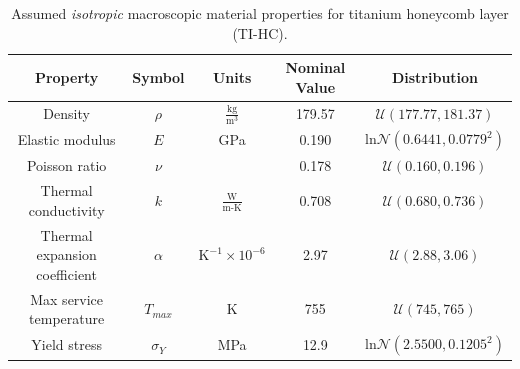\documentclass{article}
\begin{document}
\begin{table}
\caption[TI-HC material properties]{Assumed \textit{isotropic} macroscopic material properties for titanium honeycomb layer (TI-HC).}
\label{tab:matPropTI-HC}
\begin{center}
\begin{tabular}[]{ c | c | c | c | c }
\textbf{Property} & \textbf{Symbol} & \textbf{Units} & \textbf{Nominal Value} & \textbf{Distribution} \\ \hline
Density & $\rho$ & $\frac{\textrm{kg}}{\textrm{m}^3}$ & 179.57 & $\mathcal{U}(177.77,181.37)$ \\ \hline
Elastic modulus& $E$ & GPa & 0.190 & $\textrm{ln}\mathcal{N}(0.6441,0.0779^2)$ \\ \hline
Poisson ratio & $\nu$ & & 0.178 & $\mathcal{U}(0.160,0.196)$ \\ \hline
Thermal conductivity & $k$ & $\frac{\textrm{W}}{\textrm{m-K}}$ & 0.708 &  $\mathcal{U}(0.680,0.736)$ \\ \hline
Thermal expansion coefficient & $\alpha$ & $\textrm{K}^{-1} \times 10^{-6}$ & 2.97 & $\mathcal{U}(2.88,3.06)$ \\ \hline \hline
Max service temperature & $T_{max}$ & K & 755 &  $\mathcal{U}(745,765)$ \\ \hline
Yield stress & $\sigma_Y$ & MPa & 12.9 & $\textrm{ln}\mathcal{N}(2.5500,0.1205^2)$ \\ \hline
\end{tabular}
\end{center}
\end{table}
\end{document}
